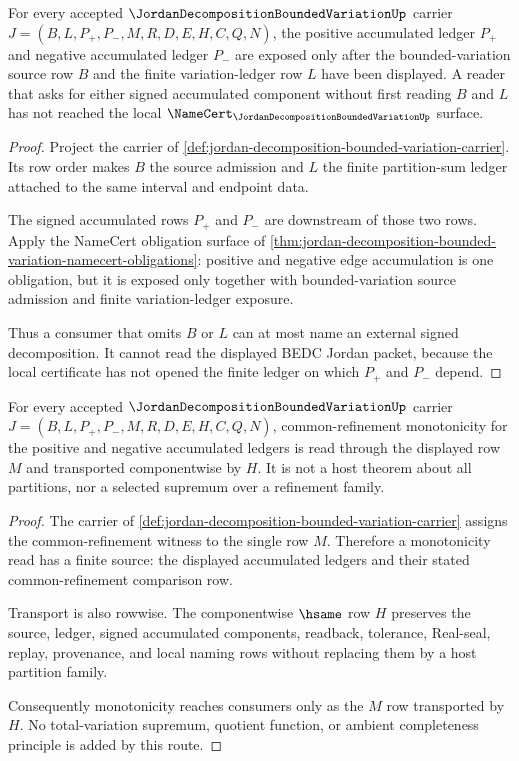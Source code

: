\begin{theorem}
\label{thm:jordan-decomposition-signed-ledger-exposure}
For every accepted $\JordanDecompositionBoundedVariationUp$ carrier $J=(B,L,P_{+},P_{-},M,R,D,E,H,C,Q,N)$, the positive accumulated ledger $P_{+}$ and negative accumulated ledger $P_{-}$ are exposed only after the bounded-variation source row $B$ and the finite variation-ledger row $L$ have been displayed. A reader that asks for either signed accumulated component without first reading $B$ and $L$ has not reached the local $\NameCert_{\JordanDecompositionBoundedVariationUp}$ surface.
\end{theorem}
\begin{proof}
Project the carrier of \autoref{def:jordan-decomposition-bounded-variation-carrier}. Its row order makes $B$ the source admission and $L$ the finite partition-sum ledger attached to the same interval and endpoint data.

The signed accumulated rows $P_{+}$ and $P_{-}$ are downstream of those two rows. Apply the NameCert obligation surface of \autoref{thm:jordan-decomposition-bounded-variation-namecert-obligations}: positive and negative edge accumulation is one obligation, but it is exposed only together with bounded-variation source admission and finite variation-ledger exposure.

Thus a consumer that omits $B$ or $L$ can at most name an external signed decomposition. It cannot read the displayed BEDC Jordan packet, because the local certificate has not opened the finite ledger on which $P_{+}$ and $P_{-}$ depend.
\end{proof}

\begin{theorem}
\label{thm:jordan-decomposition-common-refinement-monotonicity}
For every accepted $\JordanDecompositionBoundedVariationUp$ carrier $J=(B,L,P_{+},P_{-},M,R,D,E,H,C,Q,N)$, common-refinement monotonicity for the positive and negative accumulated ledgers is read through the displayed row $M$ and transported componentwise by $H$. It is not a host theorem about all partitions, nor a selected supremum over a refinement family.
\end{theorem}
\begin{proof}
The carrier of \autoref{def:jordan-decomposition-bounded-variation-carrier} assigns the common-refinement witness to the single row $M$. Therefore a monotonicity read has a finite source: the displayed accumulated ledgers and their stated common-refinement comparison row.

Transport is also rowwise. The componentwise $\hsame$ row $H$ preserves the source, ledger, signed accumulated components, readback, tolerance, Real-seal, replay, provenance, and local naming rows without replacing them by a host partition family.

Consequently monotonicity reaches consumers only as the $M$ row transported by $H$. No total-variation supremum, quotient function, or ambient completeness principle is added by this route.
\end{proof}

